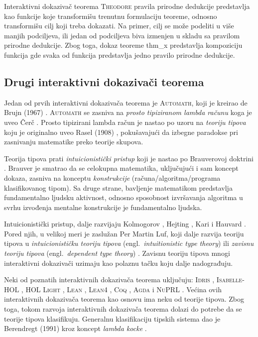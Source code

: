 \documentclass[a4paper,10pt]{article}
\theoremstyle{definition}
\begin{document}
Interaktivni dokazivač teorema \textsc{Theodore} pravila prirodne dedukcije predstavlja kao funkcije koje transformišu trenutnu formulaciju teoreme, odnosno transformišu cilj koji treba dokazati. Na primer, cilj se može podeliti u više manjih podciljeva, ili jedan od podciljeva biva izmenjen u skladu sa pravilom prirodne dedukcije. Zbog toga, dokaz teoreme thm\_x predstavlja kompoziciju funkcija gde svaka od funkcija predstavlja jedno pravilo prirodne dedukcije.

\subsection{Drugi interaktivni dokazivači teorema}
\label{sub:drugi}

Jedan od prvih interaktivni dokazivača teorema je \textsc{Automath}, koji je kreirao de Brujn (1967) \cite{deBruijn1983}. \textsc{Automath} se zasniva na \emph{prosto tipiziranom lambda računu} koga je uveo Čerč \cite{crc40, crc41}. Prosto tipizirani lambda račun je nastao po uzoru na \emph{teoriju tipova} koju je originalno uveo Rasel (1908) \cite{rus08}, pokušavajući da izbegne paradokse pri zasnivanju matematike preko teorije skupova. 

Teorija tipova prati \emph{intuicionistički pristup} koji je nastao po Brauverovoj doktrini \cite{brw07}. Brauver je smatrao da se celokupna matematika, uključujući i sam koncept dokaza, zasniva na konceptu \emph{konstrukcije} (računa/algoritma/programa klasifikovanog tipom). Sa druge strane, bavljenje matematikom predstavlja fundamentalno ljudsku aktivnost, odnosno sposobnost izvršavanja algoritma u svrhu izvođenja mentalne konstrukcije je fundamentalno ljudska. 

Intuicionistički pristup, dalje razvijaju Kolmogorov \cite{kol32}, Hejting \cite{hey66}, Kari i Hauvard \cite{how80}. Pored njih, u velikoj meri je zaslužan Per Martin Luf, koji dalje razvija teoriju tipova u \emph{intuicionističku teoriju tipova} (engl.~\emph{intuitionistic type theory}) ili \emph{zavisnu teoriju tipova} (engl.~\emph{dependent type theory}) \cite{pml98, pml75, pml82, pml93, pml84}. Zavisnu teoriju tipova mnogi interaktivni dokazivači uzimaju kao polaznu tačku koju dalje nadograđuju. 

Neki od poznatih interaktivnih dokazivača teorema uključuju: \textsc{Idris} \cite{bra13}, \textsc{Isabelle-HOL} \cite{isabelle_hol}, \textsc{HOL Light} \cite{harrison09}, \textsc{Lean} \cite{lean}, \textsc{Lean4} \cite{lean4}, \textsc{Coq} \cite{coq}, \textsc{Agda} \cite{norell09, norell07} i \textsc{NuPRL} \cite{nuprl86}. Većina ovih interaktivnih dokazivača teorema kao osnovu ima neku od teorije tipova. Zbog toga, tokom razvoja interaktivnih dokazivača teorema dolazi do potrebe da se teorije tipova klasifikuju. Generalnu klasifikaciju tipskih sistema dao je Berendregt (1991) kroz koncept \emph{lambda kocke} \cite{lambda_cube}.
\end{document}
